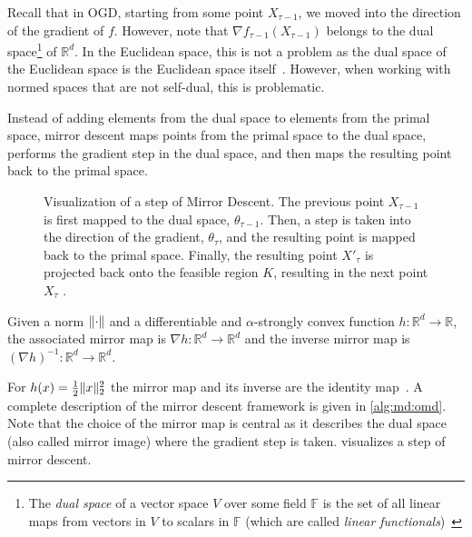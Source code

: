 Recall that in OGD, starting from some point $X_{\tau-1}$, we moved into the direction of the gradient of $f$. However, note that $\nabla f_{\tau-1}(X_{\tau-1})$ belongs to the dual space\footnote{The \emph{dual space} of a vector space $V$ over some field $\mathbb{F}$ is the set of all linear maps from vectors in $V$ to scalars in $\mathbb{F}$ (which are called \emph{linear functionals})~\cite{Wadsley2015}} of $\mathbb{R}^d$. In the Euclidean space, this is not a problem as the dual space of the Euclidean space is the Euclidean space itself~\cite{Gupta2020}. However, when working with normed spaces that are not self-dual, this is problematic.

Instead of adding elements from the dual space to elements from the primal space, mirror descent maps points from the primal space to the dual space, performs the gradient step in the dual space, and then maps the resulting point back to the primal space.

\begin{figure}
    \centering
    
    \caption{Visualization of a step of Mirror Descent. The previous point $X_{\tau-1}$ is first mapped to the dual space, $\theta_{\tau-1}$. Then, a step is taken into the direction of the gradient, $\theta_{\tau}$, and the resulting point is mapped back to the primal space. Finally, the resulting point $X'_{\tau}$ is projected back onto the feasible region $K$, resulting in the next point $X_{\tau}$ \cite{Gupta2020}.}
    \label{fig:mirror_descent}
\end{figure}

\begin{definition}
\cite{Gupta2020} Given a norm $\lVert\cdot\rVert$ and a differentiable and $\alpha$-strongly convex function $h : \mathbb{R}^d \to \mathbb{R}$, the associated mirror map is $\nabla h : \mathbb{R}^d \to \mathbb{R}^d$ and the inverse mirror map is $(\nabla h)^{-1} : \mathbb{R}^d \to \mathbb{R}^d$.
\end{definition}

For $h(x) = \frac{1}{2} \lVert x\rVert_2^2$ the mirror map and its inverse are the identity map~\cite{Gupta2020}. A complete description of the mirror descent framework is given in \cref{alg:md:omd}. Note that the choice of the mirror map is central as it describes the dual space (also called mirror image) where the gradient step is taken.  visualizes a step of mirror descent.

